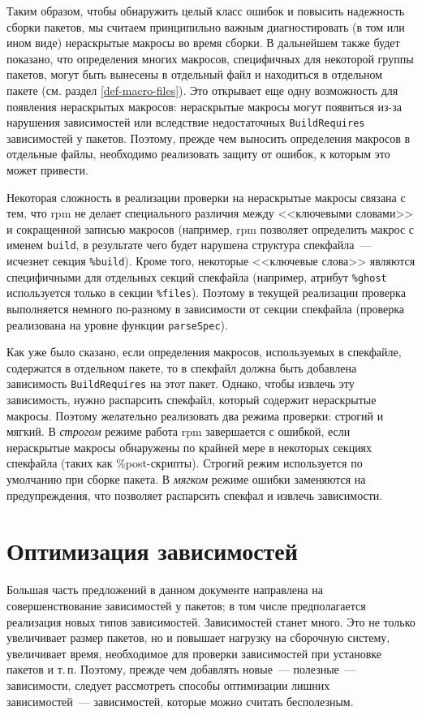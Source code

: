 \documentclass[russian,a4paper,12pt,titlepage]{article}
\begin{document}
Таким образом, чтобы обнаружить целый класс ошибок и повысить надежность сборки пакетов, мы считаем принципильно
важным диагностировать (в том или ином виде) нераскрытые макросы во время сборки.  В дальнейшем также будет показано, что
определения многих макросов, специфичных для некоторой группы пакетов, могут быть вынесены в отдельный файл и находиться
в отдельном пакете (см. раздел \ref{def-macro-files}).  Это открывает еще одну возможность для появления нераскрытых
макросов: нераскрытые макросы могут появиться из-за нарушения зависимостей или вследствие недостаточных \verb|BuildRequires|
зависимостей у пакетов.  Поэтому, прежде чем выносить определения макросов в отдельные файлы, необходимо реализовать защиту от ошибок,
к которым это может привести.

Некоторая сложность в реализации проверки на нераскрытые макросы связана с тем, что rpm не делает специального различия
между <<ключевыми словами>> и сокращенной записью макросов (например, rpm позволяет определить макрос с именем \verb|build|,
в результате чего будет нарушена структура спекфайла~--- исчезнет секция \verb|%build|).  Кроме того, некоторые <<ключевые слова>>
являются специфичными для отдельных секций спекфайла (например, атрибут \verb|%ghost| используется только в секции \verb|%files|).
Поэтому в текущей реализации проверка выполняется немного по-разному в зависимости от секции спекфайла (проверка реализована
на уровне функции \verb|parseSpec|).

Как уже было сказано, если определения макросов, используемых в спекфайле, содержатся в отдельном пакете,
то в спекфайл должна быть добавлена зависимость \verb|BuildRequires| на этот пакет.  Однако, чтобы извлечь эту зависимость,
нужно распарсить спекфайл, который содержит нераскрытые макросы.  Поэтому желательно реализовать два режима
проверки: строгий и мягкий.  В \textit{строгом} режиме работа rpm завершается с ошибкой, если нераскрытые макросы обнаружены
по крайней мере в некоторых секциях спекфайла (таких как \%post-скрипты).  Строгий режим используется по умолчанию при сборке пакета.
В \textit{мягком} режиме ошибки заменяются на предупреждения, что позволяет распарсить спекфал и извлечь зависимости.

\section{Оптимизация зависимостей}
\label{deps-optimization}
Большая часть предложений в данном документе направлена на совершенствование зависимостей у пакетов;
в том числе предполагается реализация новых типов зависимостей.  Зависимостей станет много.  Это не только
увеличивает размер пакетов, но и повышает нагрузку на сборочную систему, увеличивает время, необходимое
для проверки зависимостей при установке пакетов и т.\,п.  Поэтому, прежде чем добавлять новые~--- полезные~---
зависимости, следует рассмотреть способы оптимизации лишних зависимостей~--- зависимостей, которые можно
считать бесполезным.
\end{document}
